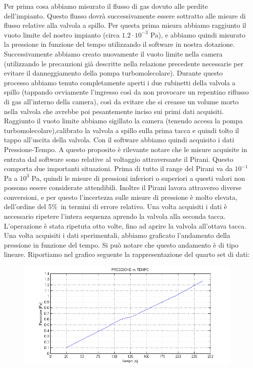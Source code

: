 \documentclass[a4paper,11pt]{article}
\begin{document}
Per prima cosa abbiamo misurato il flusso di gas dovuto alle perdite dell'impianto. Questo flusso dovrà successivamente essere sottratto alle misure di flusso relative alla valvola a spillo. Per questa prima misura abbiamo raggiunto il vuoto limite del nostro impianto (circa $1.2\cdot10^{-3}$ Pa), e abbiamo quindi misurato la pressione in funzione del tempo utilizzando il software in nostra dotazione.
Successivamente abbiamo creato nuovamente il vuoto limite nella camera (utilizzando le precauzioni già descritte nella relazione precedente necessarie per evitare il danneggiamento della pompa turbomolecolare). Durante questo processo abbiamo tenuto completamente aperti i due rubinetti della valvola a spillo (tappando ovviamente l'ingresso così da non provocare un repentino riflusso di gas all'interno della camera), così da evitare che si creasse un volume morto nella valvola che avrebbe poi pesantemente inciso sui primi dati acquisiti. Raggiunto il vuoto limite abbiamo sigillato la camera (tenendo accesa la pompa turbomolecolare),calibrato la valvola a spillo sulla prima tacca e quindi tolto il tappo all'uscita della valvola. Con il software abbiamo quindi acquisito i dati Pressione-Tempo. 
A questo proposito è rilevante notare che le misure acquisite in entrata dal software sono relative al voltaggio attraversante il Pirani. Questo comporta due importanti situazioni. Prima di tutto il range del Pirani va da $10^{-1}$ Pa a $10^{3}$ Pa, quindi le misure di pressioni inferiori o superiori a questi valori non possono essere considerate attendibili. Inoltre il Pirani lavora attraverso diverse conversioni, e per questo l'incertezza sulle misure di pressione è molto elevata, dell'ordine del 5\%\ in termini di errore relativo. 
Una volta acquisiti i dati è necessario ripetere l'intera sequenza aprendo  la valvola alla seconda tacca. L'operazione è stata ripetuta otto volte, fino ad aprire la valvola all'ottava tacca.  
Una volta acquisiti i dati sperimentali, abbiamo graficato l'andamento della pressione in funzione del tempo. Si può notare che questo andamento è di tipo lineare. Riportiamo nel grafico seguente la rappresentazione del quarto set di dati:
 \begin{center} 
\begin{figure}[htpd]
\hspace{-50 pt}
\includegraphics[scale=0.95]{graficoP4.png}


\end{figure}
\end{center}
\end{document}
